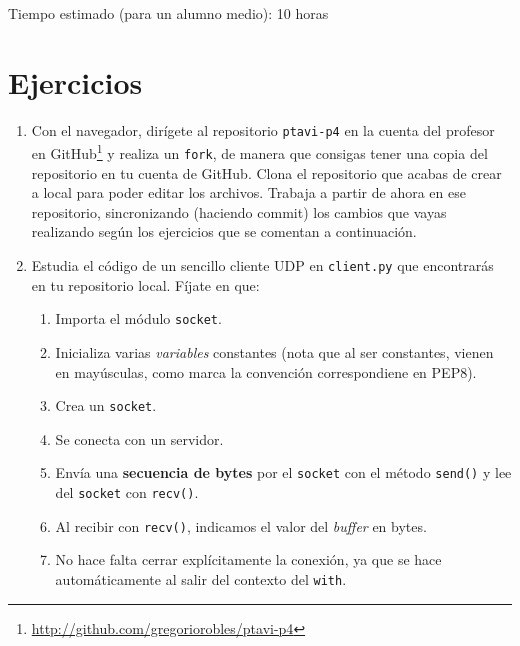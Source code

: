 \documentclass[11pt,a4paper]{article}
\begin{document}
Tiempo estimado (para un alumno medio): 10 horas

\section{Ejercicios}

\begin{enumerate}

  \item Con el navegador, dirígete al repositorio \texttt{ptavi-p4} en la cuenta del profesor en GitHub\footnote{\url{http://github.com/gregoriorobles/ptavi-p4}} y realiza un \texttt{fork}, de manera que consigas tener una copia del repositorio en tu cuenta de GitHub. Clona el repositorio que acabas de crear a local para poder editar los archivos. Trabaja a partir de ahora en ese repositorio, sincronizando (haciendo commit) los cambios que vayas realizando según los ejercicios que se comentan a continuación.

  \item Estudia el código de un sencillo cliente UDP en \texttt{client.py} que encontrarás en tu repositorio local. Fíjate en que:
  \begin{enumerate}
    \item Importa el módulo \texttt{socket}.
    \item Inicializa varias \emph{variables} constantes (nota que al ser constantes, vienen en mayúsculas, como marca la convención correspondiene en PEP8).
    \item Crea un \texttt{socket}.
    \item Se conecta con un servidor.
    \item Envía una {\bf secuencia de bytes} por el \texttt{socket} con el método \texttt{send()} y lee del \texttt{socket} con \texttt{recv()}.
    \item Al recibir con \texttt{recv()}, indicamos el valor del \emph{buffer} en bytes.
    \item No hace falta cerrar explícitamente la conexión, ya que se hace automáticamente al salir del contexto del \texttt{with}.
  \end{enumerate}



\end{enumerate}
\end{document}
